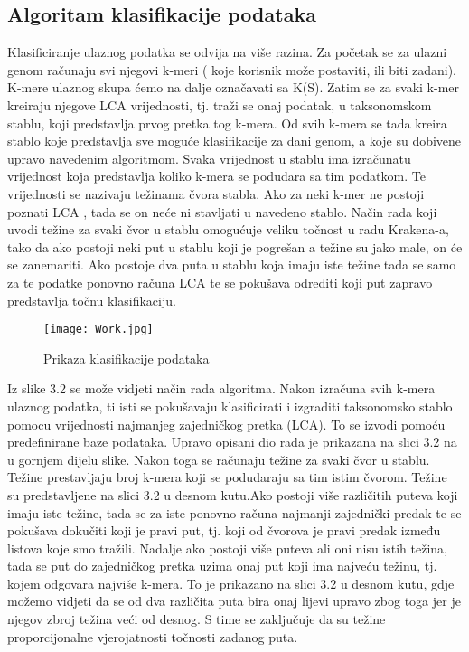 \documentclass[times, utf8, zavrsni]{fer}
\begin{document}
{\newpage
\subsection{Algoritam klasifikacije podataka}

Klasificiranje ulaznog podatka se odvija na više razina. Za početak se za ulazni genom računaju svi njegovi k-meri ( koje korisnik može postaviti, ili biti zadani). K-mere ulaznog skupa ćemo na dalje označavati sa K(S). Zatim se za svaki k-mer kreiraju njegove LCA vrijednosti, tj. traži se onaj podatak, u taksonomskom stablu, koji predstavlja prvog pretka tog k-mera. Od svih k-mera se tada kreira stablo koje predstavlja sve moguće klasifikacije za dani genom, a koje su dobivene upravo navedenim algoritmom. Svaka vrijednost u stablu ima izračunatu vrijednost koja predstavlja koliko k-mera se podudara sa tim podatkom. Te vrijednosti se nazivaju težinama čvora stabla. Ako za neki k-mer ne postoji poznati LCA , tada se on neće ni stavljati u navedeno stablo. Način rada koji uvodi težine za svaki čvor u stablu omogućuje veliku točnost u radu Krakena-a, tako da ako postoji neki put u stablu koji je pogrešan a težine su jako male, on će se zanemariti. Ako postoje dva puta u stablu koja imaju iste težine tada se samo za te podatke ponovno računa LCA te se pokušava odrediti koji put zapravo predstavlja točnu klasifikaciju.

\begin{figure}[!htbp]
	\centering
	\texttt{[image: Work.jpg]}
	\caption{Prikaza klasifikacije podataka}
	\label{Klasifikacija}
\end{figure}

Iz slike 3.2 se može vidjeti način rada algoritma. Nakon izračuna svih  k-mera ulaznog podatka, ti isti se pokušavaju klasificirati i izgraditi taksonomsko stablo pomocu vrijednosti najmanjeg zajedničkog pretka (LCA). To se izvodi pomoću predefinirane baze podataka. Upravo opisani dio rada je prikazana na slici 3.2 na u gornjem dijelu slike. Nakon toga se računaju težine za svaki čvor u stablu. Težine prestavljaju broj k-mera koji se podudaraju sa tim istim čvorom. Težine su predstavljene na slici 3.2 u desnom kutu.Ako postoji više različitih puteva koji imaju iste težine, tada se za iste ponovno računa najmanji zajednički predak te se pokušava dokučiti koji je pravi put, tj. koji od čvorova je pravi predak između listova koje smo tražili. Nadalje ako postoji više puteva ali oni nisu istih težina, tada se put do zajedničkog pretka uzima onaj put koji ima najveću težinu, tj. kojem odgovara najviše k-mera. To je prikazano na slici 3.2 u desnom kutu, gdje možemo vidjeti da se od dva različita puta bira onaj lijevi upravo zbog toga jer je njegov zbroj težina veći od desnog. S time se zaključuje da su težine proporcijonalne vjerojatnosti točnosti zadanog puta. 


}
\end{document}
